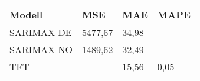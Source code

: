 \begin{tabularx}{\textwidth}{|X|X|X|X|}
    \hline
    Modell & MSE & MAE & MAPE \\ \hline \hline
    SARIMAX DE & 5477,67 & 34,98 & \\ \hline
    SARIMAX NO & 1489,62 & 32,49 & \\ \hline
    TFT & & 15,56 & 0,05 \\ \hline
\end{tabularx}
